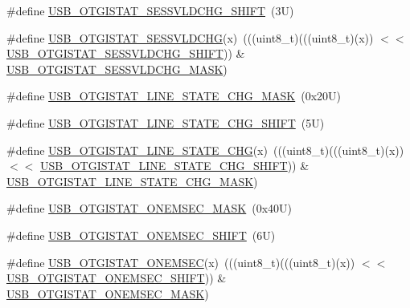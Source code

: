 \begin{DoxyCompactItemize}
\item 
\#define \mbox{\hyperlink{group___u_s_b___register___masks_gabcccd593607e1118c8283f20c69d7512}{U\+S\+B\+\_\+\+O\+T\+G\+I\+S\+T\+A\+T\+\_\+\+S\+E\+S\+S\+V\+L\+D\+C\+H\+G\+\_\+\+S\+H\+I\+FT}}~(3\+U)
\item 
\#define \mbox{\hyperlink{group___u_s_b___register___masks_gaa357c7b1590d5f90c568c26dfa2afa6c}{U\+S\+B\+\_\+\+O\+T\+G\+I\+S\+T\+A\+T\+\_\+\+S\+E\+S\+S\+V\+L\+D\+C\+HG}}(x)~(((uint8\+\_\+t)(((uint8\+\_\+t)(x)) $<$$<$ \mbox{\hyperlink{group___u_s_b___register___masks_gabcccd593607e1118c8283f20c69d7512}{U\+S\+B\+\_\+\+O\+T\+G\+I\+S\+T\+A\+T\+\_\+\+S\+E\+S\+S\+V\+L\+D\+C\+H\+G\+\_\+\+S\+H\+I\+FT}})) \& \mbox{\hyperlink{group___u_s_b___register___masks_ga859962123dc28f346bafc99263efb811}{U\+S\+B\+\_\+\+O\+T\+G\+I\+S\+T\+A\+T\+\_\+\+S\+E\+S\+S\+V\+L\+D\+C\+H\+G\+\_\+\+M\+A\+SK}})
\item 
\#define \mbox{\hyperlink{group___u_s_b___register___masks_ga596dfbf3a2a0a6e6dcb1885ef11b4f8f}{U\+S\+B\+\_\+\+O\+T\+G\+I\+S\+T\+A\+T\+\_\+\+L\+I\+N\+E\+\_\+\+S\+T\+A\+T\+E\+\_\+\+C\+H\+G\+\_\+\+M\+A\+SK}}~(0x20\+U)
\item 
\#define \mbox{\hyperlink{group___u_s_b___register___masks_ga7cb2076a9bf32a49fdbc7efcfc5fb8bb}{U\+S\+B\+\_\+\+O\+T\+G\+I\+S\+T\+A\+T\+\_\+\+L\+I\+N\+E\+\_\+\+S\+T\+A\+T\+E\+\_\+\+C\+H\+G\+\_\+\+S\+H\+I\+FT}}~(5\+U)
\item 
\#define \mbox{\hyperlink{group___u_s_b___register___masks_ga085d489cf14ed076782c1ed30a599ee4}{U\+S\+B\+\_\+\+O\+T\+G\+I\+S\+T\+A\+T\+\_\+\+L\+I\+N\+E\+\_\+\+S\+T\+A\+T\+E\+\_\+\+C\+HG}}(x)~(((uint8\+\_\+t)(((uint8\+\_\+t)(x)) $<$$<$ \mbox{\hyperlink{group___u_s_b___register___masks_ga7cb2076a9bf32a49fdbc7efcfc5fb8bb}{U\+S\+B\+\_\+\+O\+T\+G\+I\+S\+T\+A\+T\+\_\+\+L\+I\+N\+E\+\_\+\+S\+T\+A\+T\+E\+\_\+\+C\+H\+G\+\_\+\+S\+H\+I\+FT}})) \& \mbox{\hyperlink{group___u_s_b___register___masks_ga596dfbf3a2a0a6e6dcb1885ef11b4f8f}{U\+S\+B\+\_\+\+O\+T\+G\+I\+S\+T\+A\+T\+\_\+\+L\+I\+N\+E\+\_\+\+S\+T\+A\+T\+E\+\_\+\+C\+H\+G\+\_\+\+M\+A\+SK}})
\item 
\#define \mbox{\hyperlink{group___u_s_b___register___masks_gaa59b13f2f60173eaf2844dd089a6b31a}{U\+S\+B\+\_\+\+O\+T\+G\+I\+S\+T\+A\+T\+\_\+\+O\+N\+E\+M\+S\+E\+C\+\_\+\+M\+A\+SK}}~(0x40\+U)
\item 
\#define \mbox{\hyperlink{group___u_s_b___register___masks_ga561173eac45ee89d7447416da7747ec2}{U\+S\+B\+\_\+\+O\+T\+G\+I\+S\+T\+A\+T\+\_\+\+O\+N\+E\+M\+S\+E\+C\+\_\+\+S\+H\+I\+FT}}~(6\+U)
\item 
\#define \mbox{\hyperlink{group___u_s_b___register___masks_ga63d7b00bdc7b172762e10a4c19606efe}{U\+S\+B\+\_\+\+O\+T\+G\+I\+S\+T\+A\+T\+\_\+\+O\+N\+E\+M\+S\+EC}}(x)~(((uint8\+\_\+t)(((uint8\+\_\+t)(x)) $<$$<$ \mbox{\hyperlink{group___u_s_b___register___masks_ga561173eac45ee89d7447416da7747ec2}{U\+S\+B\+\_\+\+O\+T\+G\+I\+S\+T\+A\+T\+\_\+\+O\+N\+E\+M\+S\+E\+C\+\_\+\+S\+H\+I\+FT}})) \& \mbox{\hyperlink{group___u_s_b___register___masks_gaa59b13f2f60173eaf2844dd089a6b31a}{U\+S\+B\+\_\+\+O\+T\+G\+I\+S\+T\+A\+T\+\_\+\+O\+N\+E\+M\+S\+E\+C\+\_\+\+M\+A\+SK}})
$$
\end{DoxyCompactItemize}
